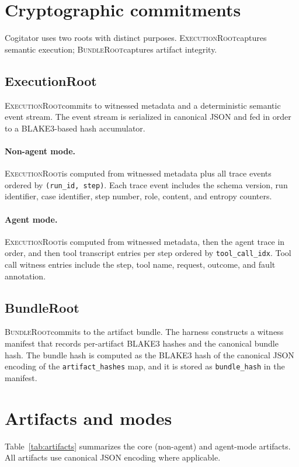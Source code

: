 \documentclass[11pt]{article}
\newcommand{\ExecutionRoot}{\textsc{ExecutionRoot}}
\newcommand{\BundleRoot}{\textsc{BundleRoot}}
\begin{document}
\section{Cryptographic commitments}
Cogitator uses two roots with distinct purposes. \ExecutionRoot captures semantic
execution; \BundleRoot captures artifact integrity.

\subsection{ExecutionRoot}
\ExecutionRoot commits to witnessed metadata and a deterministic semantic event stream.
The event stream is serialized in canonical JSON and fed in order to a BLAKE3-based
hash accumulator.

\paragraph{Non-agent mode.}
\ExecutionRoot is computed from witnessed metadata plus all trace events ordered by
\texttt{(run\_id, step)}. Each trace event includes the schema version, run identifier,
case identifier, step number, role, content, and entropy counters.

\paragraph{Agent mode.}
\ExecutionRoot is computed from witnessed metadata, then the agent trace in order, and
then tool transcript entries per step ordered by \texttt{tool\_call\_idx}. Tool call
witness entries include the step, tool name, request, outcome, and fault annotation.

\subsection{BundleRoot}
\BundleRoot commits to the artifact bundle. The harness constructs a witness manifest
that records per-artifact BLAKE3 hashes and the canonical bundle hash. The bundle hash
is computed as the BLAKE3 hash of the canonical JSON encoding of the
\texttt{artifact\_hashes} map, and it is stored as \texttt{bundle\_hash} in the manifest.

\section{Artifacts and modes}
Table~\ref{tab:artifacts} summarizes the core (non-agent) and agent-mode artifacts.
All artifacts use canonical JSON encoding where applicable.
\end{document}
